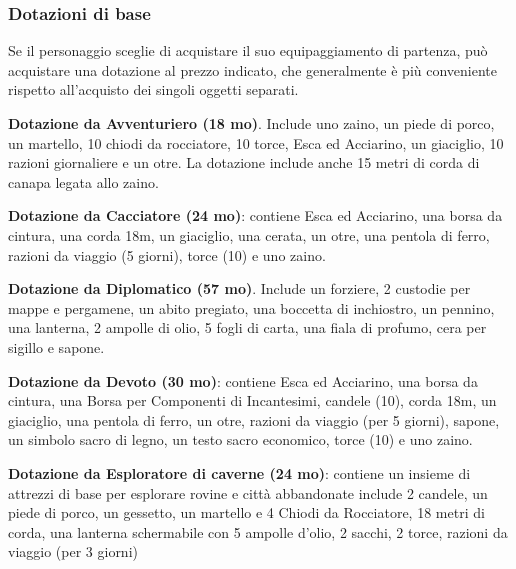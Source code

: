 \begin{multicols}{2}
\subsubsection{Dotazioni di base}\hypertarget{Dotazioni di base}{}
Se il personaggio sceglie di acquistare il suo equipaggiamento di partenza, può acquistare una dotazione al prezzo indicato, che generalmente è più conveniente rispetto all'acquisto dei singoli oggetti separati.

\textbf{Dotazione da Avventuriero (18 mo)}. Include uno zaino, un piede di porco, un martello, 10 chiodi da rocciatore, 10 torce, Esca ed Acciarino, un giaciglio, 10 razioni giornaliere e un otre. La dotazione include anche 15 metri di corda di canapa legata allo zaino.

\textbf{Dotazione da Cacciatore (24 mo)}: contiene Esca ed Acciarino, una borsa da cintura, una corda 18m, un giaciglio, una cerata, un otre, una pentola di ferro, razioni da viaggio (5 giorni), torce (10) e uno zaino.

\textbf{Dotazione da Diplomatico (57 mo)}. Include un forziere, 2 custodie per mappe e pergamene, un abito pregiato, una boccetta di inchiostro, un pennino, una lanterna, 2 ampolle di olio, 5 fogli di carta, una fiala di profumo, cera per sigillo e sapone.

\textbf{Dotazione da Devoto (30 mo)}: contiene Esca ed Acciarino, una borsa da cintura, una Borsa per Componenti di Incantesimi, candele (10), corda 18m, un giaciglio, una pentola di ferro, un otre, razioni da viaggio (per 5 giorni), sapone, un simbolo sacro di legno, un testo sacro economico, torce (10) e uno zaino.


\textbf{Dotazione da Esploratore di caverne (24 mo)}: contiene un insieme di attrezzi di base per esplorare rovine e città abbandonate include 2 candele, un piede di porco, un gessetto, un martello e 4 Chiodi da Rocciatore, 18 metri di corda, una lanterna schermabile con 5 ampolle d'olio, 2 sacchi, 2 torce, razioni da viaggio (per 3 giorni)


\end{multicols}
